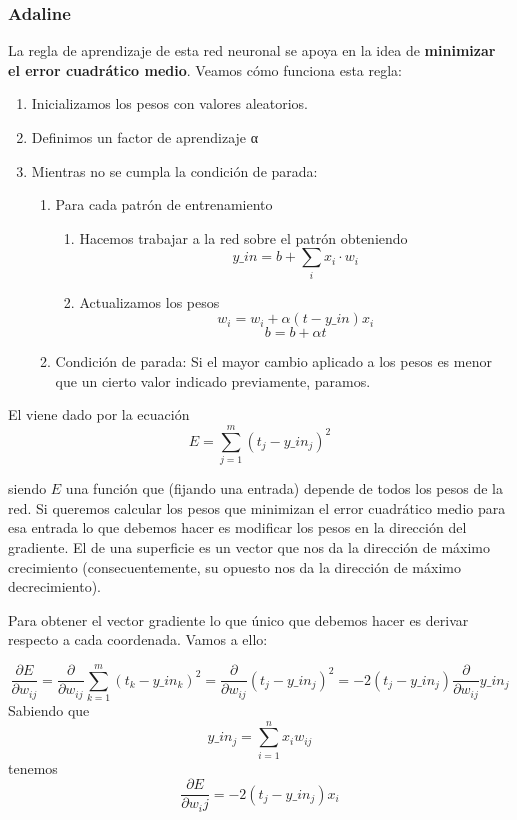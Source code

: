 \subsubsection{Adaline}
La regla de aprendizaje de esta red neuronal se apoya en la idea de \textbf{minimizar el error cuadrático medio}. Veamos cómo funciona esta regla:
\begin{enumerate}
\item Inicializamos los pesos con valores aleatorios.
\item Definimos un factor de aprendizaje α
\item Mientras no se cumpla la condición de parada:
\begin{enumerate}
\item Para cada patrón de entrenamiento
\begin{enumerate}
\item Hacemos trabajar a la red sobre el patrón obteniendo
\[y\_in = b + \sum_i x_i\cdot w_i\]

\item Actualizamos los pesos
\[w_i = w_i + α(t-y\_in)x_i\]
\[b = b + αt\]
\end{enumerate}
\item Condición de parada: Si el mayor cambio aplicado a los pesos es menor que un cierto valor indicado previamente, paramos.
\end{enumerate}
\end{enumerate}

El  viene dado por la ecuación
\[E = \sum_{j=1}^m(t_j-y\_in_j)^2\]

siendo $E$ una función que (fijando una entrada) depende de todos los pesos de la red. Si queremos calcular los pesos que minimizan el error cuadrático medio para esa entrada lo que debemos hacer es modificar los pesos en la dirección del gradiente. El  de una superficie es un vector que nos da la dirección de máximo crecimiento (consecuentemente, su opuesto nos da la dirección de máximo decrecimiento).

Para obtener el vector gradiente lo que único que debemos hacer es derivar respecto a cada coordenada. Vamos a ello:

\[\frac{\partial E}{\partial w_{ij}} = \frac{\partial}{\partial w_{ij}}\sum_{k=1}^m(t_k-y\_in_k)^2 = \frac{\partial}{\partial w_{ij}} (t_j - y\_in_j)^2 = -2(t_j-y\_in_j)\frac{\partial}{\partial w_{ij}}y\_in_j\]
Sabiendo que
\[y\_in_j = \sum_{i=1}^n x_i w_{ij}\]
tenemos
\[\frac{\partial E}{\partial w_ij}=-2(t_j-y\_in_j)x_i\]

